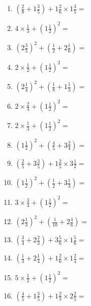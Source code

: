 \documentclass[12pt]{article}
\begin{document}
\begin{enumerate}
\item \large $ (\frac{2}{8} + 1 \frac{3}{5}) + 1 \frac{2}{6} \times 1 \frac{3}{5} = $ \vspace{1.8cm}
\item \large $ 4 \times \frac{1}{3} + (1 \frac{1}{2})^2 = $ \vspace{1.8cm}
\item \large $ (2 \frac{3}{5})^2 + (\frac{1}{2} + 2 \frac{1}{6}) = $ \vspace{1.8cm}
\item \large $ 2 \times \frac{1}{2} + (1 \frac{1}{2})^2 = $ \vspace{1.8cm}
\item \large $ (2 \frac{1}{4})^2 + (\frac{1}{8} + 1 \frac{1}{3}) = $ \vspace{1.8cm}
\item \large $ 2 \times \frac{2}{3} + (1 \frac{1}{2})^2 = $ \vspace{1.8cm}
\item \large $ 2 \times \frac{1}{3} + (1 \frac{1}{2})^2 = $ \vspace{1.8cm}
\item \large $ (1 \frac{1}{2})^2 + (\frac{4}{5} + 3 \frac{2}{4}) = $ \vspace{1.8cm}
\item \large $ (\frac{2}{5} + 3 \frac{3}{5}) + 1 \frac{2}{5} \times 3 \frac{1}{2} = $ \vspace{1.8cm}
\item \large $ (1 \frac{1}{2})^2 + (\frac{1}{2} + 3 \frac{1}{3}) = $ \vspace{1.8cm}
\newpage
\item \large $ 3 \times \frac{3}{4} + (1 \frac{1}{2})^2 = $ \vspace{1.8cm}
\item \large $ (2 \frac{1}{3})^2 + (\frac{1}{10} + 2 \frac{4}{6}) = $ \vspace{1.8cm}
\item \large $ (\frac{3}{4} + 2 \frac{2}{3}) + 3 \frac{5}{6} \times 1 \frac{5}{6} = $ \vspace{1.8cm}
\item \large $ (\frac{1}{3} + 2 \frac{1}{4}) + 1 \frac{2}{6} \times 1 \frac{2}{4} = $ \vspace{1.8cm}
\item \large $ 5 \times \frac{1}{2} + (1 \frac{1}{2})^2 = $ \vspace{1.8cm}
\item \large $ (\frac{4}{5} + 1 \frac{3}{5}) + 1 \frac{2}{3} \times 2 \frac{2}{5} = $ \vspace{1.8cm}

\end{enumerate}
\end{document}
